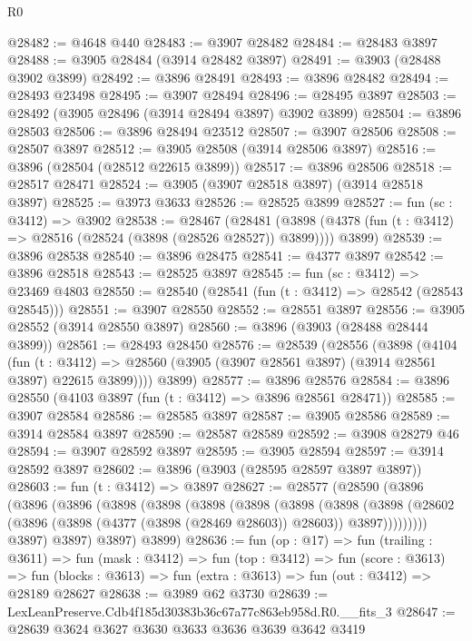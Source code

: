 \begin{lexlean}{R0}
\begin{coremodule}
@28482 := @4648 @440
@28483 := @3907 @28482
@28484 := @28483 @3897
@28488 := @3905 @28484 (@3914 @28482 @3897)
@28491 := @3903 (@28488 @3902 @3899)
@28492 := @3896 @28491
@28493 := @3896 @28482
@28494 := @28493 @23498
@28495 := @3907 @28494
@28496 := @28495 @3897
@28503 := @28492 (@3905 @28496 (@3914 @28494 @3897) @3902 @3899)
@28504 := @3896 @28503
@28506 := @3896 @28494 @23512
@28507 := @3907 @28506
@28508 := @28507 @3897
@28512 := @3905 @28508 (@3914 @28506 @3897)
@28516 := @3896 (@28504 (@28512 @22615 @3899))
@28517 := @3896 @28506
@28518 := @28517 @28471
@28524 := @3905 (@3907 @28518 @3897) (@3914 @28518 @3897)
@28525 := @3973 @3633
@28526 := @28525 @3899
@28527 := fun (sc : @3412) => @3902
@28538 := @28467
    (@28481
      (@3898 (@4378 (fun (t : @3412) => @28516 (@28524 (@3898 (@28526 @28527)) @3899))))
      @3899)
@28539 := @3896 @28538
@28540 := @3896 @28475
@28541 := @4377 @3897
@28542 := @3896 @28518
@28543 := @28525 @3897
@28545 := fun (sc : @3412) => @23469 @4803
@28550 := @28540 (@28541 (fun (t : @3412) => @28542 (@28543 @28545)))
@28551 := @3907 @28550
@28552 := @28551 @3897
@28556 := @3905 @28552 (@3914 @28550 @3897)
@28560 := @3896 (@3903 (@28488 @28444 @3899))
@28561 := @28493 @28450
@28576 := @28539
    (@28556
      (@3898
        (@4104
          (fun (t : @3412) =>
          @28560 (@3905 (@3907 @28561 @3897) (@3914 @28561 @3897) @22615 @3899))))
      @3899)
@28577 := @3896 @28576
@28584 := @3896 @28550 (@4103 @3897 (fun (t : @3412) => @3896 @28561 @28471))
@28585 := @3907 @28584
@28586 := @28585 @3897
@28587 := @3905 @28586
@28589 := @3914 @28584 @3897
@28590 := @28587 @28589
@28592 := @3908 @28279 @46
@28594 := @3907 @28592 @3897
@28595 := @3905 @28594
@28597 := @3914 @28592 @3897
@28602 := @3896 (@3903 (@28595 @28597 @3897 @3897))
@28603 := fun (t : @3412) => @3897
@28627 := @28577
    (@28590
      (@3896
        (@3896
          (@3896
            (@3898
              (@3898
                (@3898
                  (@3898
                    (@3898
                      (@3898
                        (@3898
                          (@28602
                            (@3896 (@3898 (@4377 (@3898 (@28469 @28603)) @28603)) @3897)))))))))
            @3897)
          @3897)
        @3897)
      @3899)
@28636 := fun (op : @17) =>
  fun (trailing : @3611) =>
  fun (mask : @3412) =>
  fun (top : @3412) =>
  fun (score : @3613) =>
  fun (blocks : @3613) => fun (extra : @3613) => fun (out : @3412) => @28189 @28627
@28638 := @3989 @62 @3730
@28639 := LexLeanPreserve.Cdb4f185d30383b36c67a77c863eb958d.R0.__fits_3
@28647 := @28639 @3624 @3627 @3630 @3633 @3636 @3639 @3642 @3419

\end{coremodule}
\end{lexlean}
